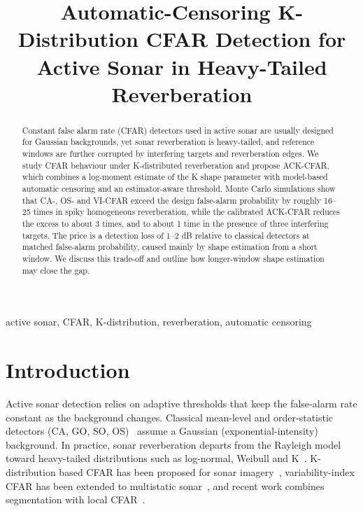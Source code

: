 \documentclass[conference]{IEEEtran}
\begin{document}
\title{Automatic-Censoring K-Distribution CFAR Detection for Active Sonar in Heavy-Tailed Reverberation}

\author{
}

\maketitle

\begin{abstract}
Constant false alarm rate (CFAR) detectors used in active sonar are usually designed for Gaussian backgrounds, yet sonar reverberation is heavy-tailed, and reference windows are further corrupted by interfering targets and reverberation edges. We study CFAR behaviour under K-distributed reverberation and propose ACK-CFAR, which combines a log-moment estimate of the K shape parameter with model-based automatic censoring and an estimator-aware threshold. Monte Carlo simulations show that CA-, OS- and VI-CFAR exceed the design false-alarm probability by roughly 16--25 times in spiky homogeneous reverberation, while the calibrated ACK-CFAR reduces the excess to about 3 times, and to about 1 time in the presence of three interfering targets. The price is a detection loss of 1--2 dB relative to classical detectors at matched false-alarm probability, caused mainly by shape estimation from a short window. We discuss this trade-off and outline how longer-window shape estimation may close the gap.
\end{abstract}

\begin{IEEEkeywords}
active sonar, CFAR, K-distribution, reverberation, automatic censoring
\end{IEEEkeywords}

\section{Introduction}
Active sonar detection relies on adaptive thresholds that keep the false-alarm rate constant as the background changes. Classical mean-level and order-statistic detectors (CA, GO, SO, OS)~\cite{finn1968,rohling1983} assume a Gaussian (exponential-intensity) background. In practice, sonar reverberation departs from the Rayleigh model toward heavy-tailed distributions such as log-normal, Weibull and K~\cite{zhang2017}. K-distribution based CFAR has been proposed for sonar imagery~\cite{abu2020}, variability-index CFAR has been extended to multistatic sonar~\cite{vi_sonar}, and recent work combines segmentation with local CFAR~\cite{sow2025}.
\end{document}
